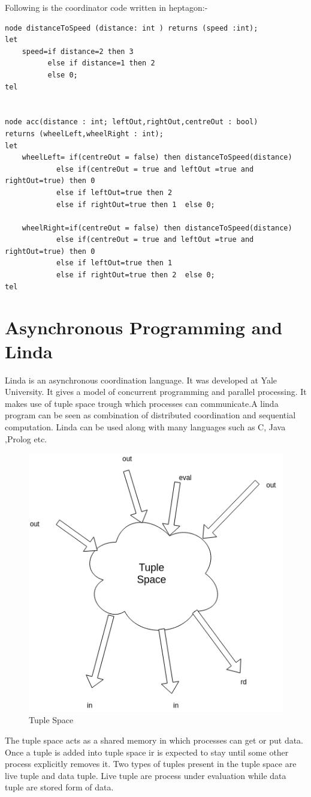 \documentclass[16pt]{report}
\begin{document}
\noindent
Following is the coordinator code written in heptagon:-


\begin{verbatim}
node distanceToSpeed (distance: int ) returns (speed :int);
let
    speed=if distance=2 then 3
          else if distance=1 then 2
          else 0;
tel


node acc(distance : int; leftOut,rightOut,centreOut : bool)
returns (wheelLeft,wheelRight : int);
let
    wheelLeft= if(centreOut = false) then distanceToSpeed(distance)
            else if(centreOut = true and leftOut =true and rightOut=true) then 0
            else if leftOut=true then 2
            else if rightOut=true then 1  else 0;

    wheelRight=if(centreOut = false) then distanceToSpeed(distance)
            else if(centreOut = true and leftOut =true and rightOut=true) then 0
            else if leftOut=true then 1
            else if rightOut=true then 2  else 0;
tel
\end{verbatim}{}


\section{Asynchronous Programming and Linda}
Linda is an asynchronous coordination language. It was developed at Yale University. It gives a model of concurrent programming and parallel processing. It makes use of tuple space trough which processes can communicate.A linda program can be seen as combination of distributed coordination and sequential computation. Linda can be used along with many languages such as C, Java ,Prolog etc.

\begin{figure}[H]
\centering
\includegraphics[width=0.8\linewidth]{fig8.png}
\caption{Tuple Space}
\end{figure}
The tuple space acts as a shared memory in which processes can get or put data. Once a tuple is added into tuple space ir is expected to stay until some other process explicitly removes it. Two types of tuples present in the tuple space are live tuple and data tuple. Live tuple are process under evaluation while data tuple are stored form of data. \\
\end{document}
